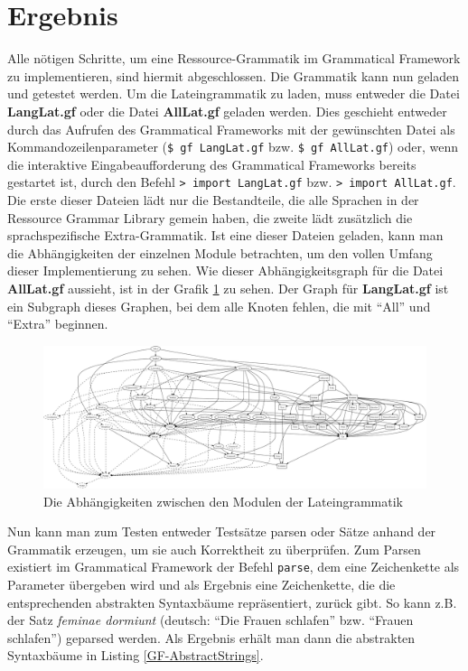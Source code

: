 \section{Ergebnis}
Alle nötigen Schritte, um eine Ressource-Grammatik im Grammatical Framework zu implementieren, sind hiermit abgeschlossen. Die Grammatik kann nun geladen und getestet werden. Um die Lateingrammatik zu laden, muss entweder die Datei \textbf{LangLat.gf} oder die Datei \textbf{AllLat.gf} geladen werden. Dies geschieht entweder durch das Aufrufen des Grammatical Frameworks mit der gewünschten Datei als Kommandozeilenparameter (\texttt{\$ gf LangLat.gf} bzw. \texttt{\$ gf AllLat.gf}) oder, wenn die interaktive Eingabeaufforderung des Grammatical Frameworks bereits gestartet ist, durch den Befehl \texttt{> import LangLat.gf} bzw. \texttt{> import AllLat.gf}. Die erste dieser Dateien lädt nur die Bestandteile, die alle Sprachen in der Ressource Grammar Library gemein haben, die zweite lädt zusätzlich die sprachspezifische Extra-Grammatik. Ist eine dieser Dateien geladen, kann man die Abhängigkeiten der einzelnen Module betrachten, um den vollen Umfang dieser Implementierung zu sehen. Wie dieser Abhängigkeitsgraph für die Datei \textbf{AllLat.gf} aussieht, ist in der Grafik \ref{GF-DepGraph} zu sehen. Der Graph für \textbf{LangLat.gf} ist ein Subgraph dieses Graphen, bei dem alle Knoten fehlen, die mit ``All'' und ``Extra'' beginnen. \par
\begin{figure}
\includegraphics[scale=0.25]{graphics/LatinDependencyGraph.eps}
\caption{Die Abhängigkeiten zwischen den Modulen der Lateingrammatik}\label{GF-DepGraph}
\end{figure}
Nun kann man zum Testen entweder Testsätze parsen oder Sätze anhand der Grammatik erzeugen, um sie auch Korrektheit zu überprüfen. Zum Parsen existiert im Grammatical Framework der Befehl \texttt{parse}, dem eine Zeichenkette als Parameter übergeben wird und als Ergebnis eine Zeichenkette, die die entsprechenden abstrakten Syntaxbäume repräsentiert, zurück gibt. So kann z.B. der Satz \textit{feminae dormiunt} (deutsch: ``Die Frauen schlafen'' bzw. ``Frauen schlafen'') geparsed werden. Als Ergebnis erhält man dann die abstrakten Syntaxbäume in Listing \ref{GF-AbstractStrings}. 

